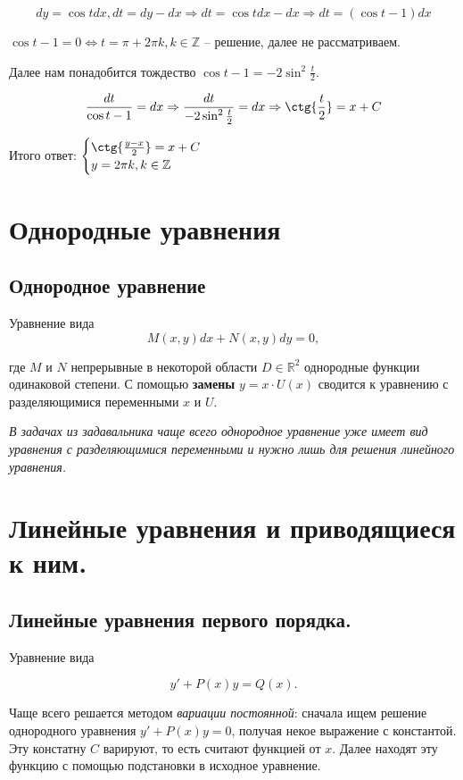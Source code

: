 \[
dy=\cos{t}dx, dt=dy-dx \Rightarrow dt=\cos{t}dx-dx \Rightarrow dt=(\cos{t}-1)dx
\]

$\cos{t}-1=0 \Leftrightarrow t=\pi + 2\pi k, k \in \mathbb{Z}$ -- решение, далее не рассматриваем.

Далее нам понадобится тождество $\cos{t}-1=-2\sin^2{\frac{t}{2}}$.

\[
\frac{dt}{\cos{t}-1}=dx \Rightarrow \frac{dt}{-2\sin^2{\frac{t}{2}}}=dx \Rightarrow \ctg{\frac{t}{2}}=x+C
\]

Итого ответ: $
\begin{cases} 
    \ctg{\frac{y-x}{2}}=x+C \\ 
    y=2\pi k, k\in \mathbb{Z}
\end{cases}
$

\section{Однородные уравнения}

\subsection{Однородное уравнение}

Уравнение вида
\[
M(x,y)dx + N(x,y)dy = 0,
\]

где $M$ и $N$ непрерывные в некоторой области $D \in \mathbb{R}^2$ однородные функции одинаковой степени. С помощью \textbf{замены} $y=x\cdot U(x)$ сводится к уравнению с разделяющимися переменными $x$ и $U$.

\textit{В задачах из задавальника чаще всего однородное уравнение уже имеет вид уравнения с разделяющимися переменными и нужно лишь для решения \textit{линейного уравнения}.}

\section{Линейные уравнения и приводящиеся к ним.}

\subsection{Линейные уравнения первого порядка.}

Уравнение вида

\[
y'+P(x)y=Q(x).
\]

Чаще всего решается методом \textit{вариации постоянной}: сначала ищем решение однородного уравнения $y'+P(x)y=0$, получая некое выражение с константой. Эту констатну $C$ варируют, то есть считают функцией от $x$. Далее находят эту функцию с помощью подстановки в исходное уравнение.

